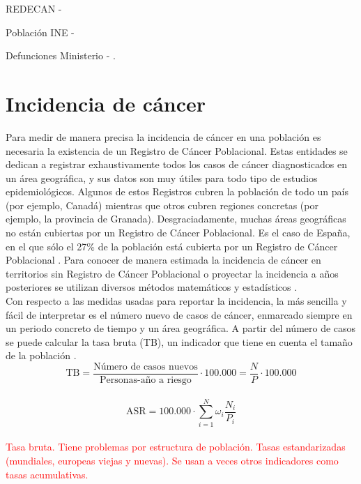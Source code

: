 REDECAN - \cite{REDECAN2020}

Población INE - \cite{INEpob}

Defunciones Ministerio - \cite{MSCBS}.

\section{Incidencia de cáncer}

Para medir de manera precisa la incidencia de cáncer en una población es necesaria la existencia de un Registro de Cáncer Poblacional. Estas entidades se dedican a registrar exhaustivamente todos los casos de cáncer diagnosticados en un área geográfica, y sus datos son muy útiles para todo tipo de estudios epidemiológicos. Algunos de estos Registros cubren la población de todo un país (por ejemplo, Canadá) mientras que otros cubren regiones concretas (por ejemplo, la provincia de Granada). Desgraciadamente, muchas áreas geográficas no están cubiertas por un Registro de Cáncer Poblacional. Es el caso de España, en el que sólo el 27\% de la población está cubierta por un Registro de Cáncer Poblacional \cite{Redondo-Sanchez2019}. Para conocer de manera estimada la incidencia de cáncer en territorios sin Registro de Cáncer Poblacional o proyectar la incidencia a años posteriores se utilizan diversos métodos matemáticos y estadísticos \cite{Bray2018, GCO, ECIS, ECIS2, REDECAN2020, Redondo-Sanchez2019}.\\

Con respecto a las medidas usadas para reportar la incidencia, la más sencilla y fácil de interpretar es el número nuevo de casos de cáncer, enmarcado siempre en un periodo concreto de tiempo y un área geográfica. A partir del número de casos se puede calcular la tasa bruta (TB), un indicador que tiene en cuenta el tamaño de la población \cite{IARC1995}.\\

$$\text{TB}  = \dfrac{\text{Número de casos nuevos}}{\text{Personas-año a riesgo}} \cdot 100.000 = \dfrac{N}{P} \cdot 100.000$$\\

$$\text{ASR} = 100.000 \cdot \sum_{i = 1}^{N} \omega_i \dfrac{N_i}{P_i} $$\\

\textcolor{red}{Tasa bruta. Tiene problemas por estructura de población. Tasas estandarizadas (mundiales, europeas viejas y nuevas). Se usan a veces otros indicadores como tasas acumulativas.}\\


